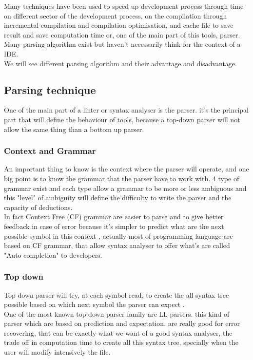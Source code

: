 Many techniques have been used to speed up development process through time on different sector of the development process, on the compilation through incremental compilation and compilation optimisation, and cache file to save result and save computation time or, one of the main part of this tools, parser.
Many parsing algorithm exist but haven't necessarily think for the context of a IDE.
\\We will see different parsing algorithm and their advantage and disadvantage.
\subsection{Parsing technique}
One of the main part of a linter or syntax analyser is the parser. it's the principal part that will define the behaviour of tools, because a top-down parser will not allow the same thing than a bottom up parser.
\subsubsection{Context and Grammar}
An important thing to know is the context where the parser will operate, and one big point is to know the grammar that the parser have to work with. 4 type of grammar exist\cite{grune2008parsing} and each type allow a grammar to be more or less ambiguous and this "level" of ambiguity will define the difficulty to write the parser and the capacity of deductions.
\\In fact Context Free (CF) grammar \cite{cfg_def} are easier to parse and to give better feedback in case of error because it's simpler to predict what are the next possible symbol in this context \cite{grune2008parsing}, actually most of programming language are based on CF grammar, that allow syntax analyser to offer what's are called "Auto-completion" to developers. 

\subsubsection{Top down}
Top down parser will try, at each symbol read, to create the all syntax tree possible based on which next symbol the parser can expect \cite{knuth1971top}\cite{grune2008parsing}. 
\\One of the most known top-down parser family are LL parsers. this kind of parser which are based on prediction and expectation, are really good for error recovering\cite{panopticoncentral_2009}, that can be exactly what we want of a good syntax analyser, the trade off in computation time to create all this syntax tree, specially when the user will modify intensively the file.
    
